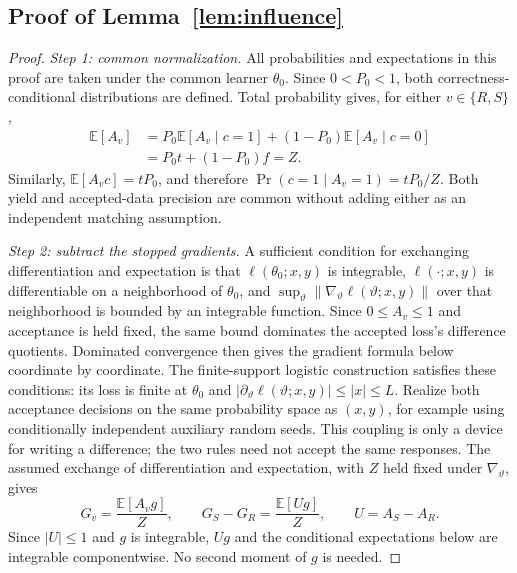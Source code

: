 \subsection{Proof of Lemma~\ref{lem:influence}}
\begin{proof}
\textit{Step 1: common normalization.}
All probabilities and expectations in this proof are taken under the common
learner $\theta_0$. Since $0<P_0<1$, both correctness-conditional
distributions are defined. Total probability gives, for either $v\in\{R,S\}$,
\begin{align*}
 \mathbb E[A_v]
 &=P_0\mathbb E[A_v\mid c=1]+(1-P_0)\mathbb E[A_v\mid c=0]\\
 &=P_0t+(1-P_0)f=Z.
\end{align*}
Similarly, $\mathbb E[A_v c]=tP_0$, and therefore
$\Pr(c=1\mid A_v=1)=tP_0/Z$. Both yield and accepted-data precision are
common without adding either as an independent matching assumption.

\textit{Step 2: subtract the stopped gradients.}
A sufficient condition for exchanging differentiation and expectation is
that $\ell(\theta_0;x,y)$ is integrable, $\ell(\cdot;x,y)$ is differentiable
on a neighborhood of $\theta_0$, and
$\sup_{\vartheta}\|\nabla_\vartheta\ell(\vartheta;x,y)\|$
over that neighborhood is bounded by an integrable function.
Since $0\leq A_v\leq1$ and acceptance is held fixed, the same bound
dominates the accepted loss's difference quotients. Dominated convergence
then gives the gradient formula below coordinate by coordinate.
The finite-support logistic construction satisfies these conditions:
its loss is finite at $\theta_0$ and
$|\partial_\vartheta\ell(\vartheta;x,y)|\leq|x|\leq L$.
Realize both acceptance decisions on the same probability space as $(x,y)$,
for example using conditionally independent auxiliary random seeds. This
coupling is only a device for writing a difference; the two rules need not
accept the same responses. The assumed exchange of differentiation and
expectation, with $Z$ held fixed under $\nabla_\vartheta$, gives
\begin{equation}
 G_v=\frac{\mathbb E[A_v g]}{Z},\qquad
 G_S-G_R=\frac{\mathbb E[Ug]}{Z},\qquad U=A_S-A_R.
 \label{eq:app-gradient-difference}
\end{equation}
Since $|U|\leq1$ and $g$ is integrable, $Ug$ and the conditional
expectations below are integrable componentwise. No second moment of $g$
is needed.


\end{proof}
